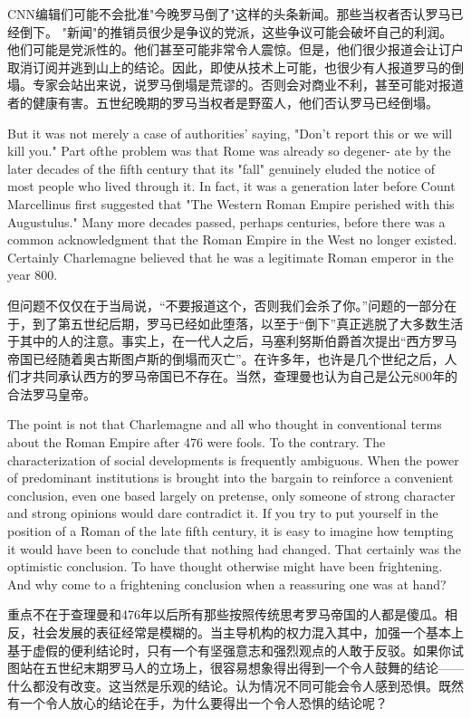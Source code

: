 \begin{paracol}{2}
\switchcolumn
CNN编辑们可能不会批准"今晚罗马倒了"这样的头条新闻。那些当权者否认罗马已经倒下。 "新闻"的推销员很少是争议的党派，这些争议可能会破坏自己的利润。他们可能是党派性的。他们甚至可能非常令人震惊。但是，他们很少报道会让订户取消订阅并逃到山上的结论。因此，即使从技术上可能，也很少有人报道罗马的倒塌。专家会站出来说，说罗马倒塌是荒谬的。否则会对商业不利，甚至可能对报道者的健康有害。五世纪晚期的罗马当权者是野蛮人，他们否认罗马已经倒塌。

\switchcolumn*
But it was not merely a case of authorities' saying, "Don't report this or we will kill you." Part ofthe problem was that Rome was already so degener- ate by the later decades of the fifth century that its "fall" genuinely eluded the notice of most people who lived through it. In fact, it was a generation later before Count Marcellinus first suggested that "The Western Roman Empire perished with this Augustulus." Many more decades passed, perhaps centuries, before there was a common acknowledgment that the Roman Empire in the West no longer existed. Certainly Charlemagne believed that he was a legitimate Roman emperor in the year 800.  

\switchcolumn
但问题不仅仅在于当局说，“不要报道这个，否则我们会杀了你。”问题的一部分在于，到了第五世纪后期，罗马已经如此堕落，以至于“倒下”真正逃脱了大多数生活于其中的人的注意。事实上，在一代人之后，马塞利努斯伯爵首次提出“西方罗马帝国已经随着奥古斯图卢斯的倒塌而灭亡”。在许多年，也许是几个世纪之后，人们才共同承认西方的罗马帝国已不存在。当然，查理曼也认为自己是公元800年的合法罗马皇帝。

\switchcolumn*
The point is not that Charlemagne and all who thought in conventional terms about the Roman Empire after 476 were fools. To the contrary. The characterization of social developments is frequently ambiguous. When the power of predominant institutions is brought into the bargain to reinforce a convenient conclusion, even one based largely on pretense, only someone of strong character and strong opinions would dare contradict it. If you try to put yourself in the position of a Roman of the late fifth century, it is easy to imagine how tempting it would have been to conclude that nothing had changed. That certainly was the optimistic conclusion. To have thought otherwise might have been frightening. And why come to a frightening conclusion when a reassuring one was at hand? 

\switchcolumn
重点不在于查理曼和476年以后所有那些按照传统思考罗马帝国的人都是傻瓜。相反，社会发展的表征经常是模糊的。当主导机构的权力混入其中，加强一个基本上基于虚假的便利结论时，只有一个有坚强意志和强烈观点的人敢于反驳。如果你试图站在五世纪末期罗马人的立场上，很容易想象得出得到一个令人鼓舞的结论——什么都没有改变。这当然是乐观的结论。认为情况不同可能会令人感到恐惧。既然有一个令人放心的结论在手，为什么要得出一个令人恐惧的结论呢？


\end{paracol}
